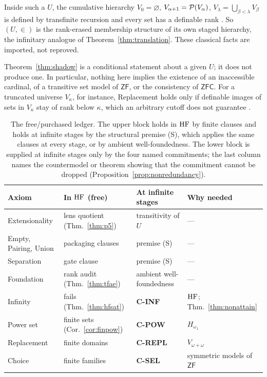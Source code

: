 Inside such a $U$, the cumulative hierarchy $V_0=\varnothing$, $V_{\alpha+1}=\mathcal{P}(V_\alpha)$,
$V_\lambda=\bigcup_{\beta<\lambda}V_\beta$ is defined by transfinite recursion \citep{Zermelo1930}
and every set has a definable rank \citep[Ch.~6]{Jech2003}. So $(U,\in)$ is the rank-erased
membership structure of its own staged hierarchy, the infinitary analogue of
Theorem~\ref{thm:translation}. These classical facts are imported, not reproved.

Theorem~\ref{thm:shadow} is a conditional statement about a given $U$; it does not produce one.
In particular, nothing here implies the existence of an inaccessible cardinal, of a transitive set
model of $\mathsf{ZF}$, or the consistency of $\mathsf{ZFC}$. For a truncated universe $V_\kappa$,
for instance, Replacement holds only if definable images of sets in $V_\kappa$ stay of rank below
$\kappa$, which an arbitrary cutoff does not guarantee \citep{MontagueVaught1959}.

\begin{table}[tbp]\centering
\small
\begin{tabular}{@{}llll@{}}
\toprule
Axiom & In $\mathrm{HF}$ (free) & At infinite stages & Why needed \\
\midrule
Extensionality & lens quotient (Thm.~\ref{thm:p5}) & transitivity of $U$ & --- \\
Empty, Pairing, Union & packaging clauses & premise (S) & --- \\
Separation & gate clause & premise (S) & --- \\
Foundation & rank audit (Thm.~\ref{thm:tfae}) & ambient well-foundedness & --- \\
\midrule
Infinity & fails (Thm.~\ref{thm:hfsat}) & \textbf{C-INF} & $\mathrm{HF}$; Thm.~\ref{thm:nonattain} \\
Power set & finite sets (Cor.~\ref{cor:finpow}) & \textbf{C-POW} & $H_{\omega_1}$ \\
Replacement & finite domains & \textbf{C-REPL} & $V_{\omega+\omega}$ \\
Choice & finite families & \textbf{C-SEL} & symmetric models of $\mathsf{ZF}$ \\
\bottomrule
\end{tabular}
\caption{The free/purchased ledger. The upper block holds in $\mathrm{HF}$ by finite clauses and holds at
infinite stages by the structural premise (S), which applies the same clauses at every stage, or
by ambient well-foundedness. The lower block is supplied at infinite stages only by the four named
commitments; the last column names the countermodel or theorem showing that the commitment cannot
be dropped (Proposition~\ref{prop:nonredundancy}).}
\label{tab:factorization}
\end{table}

